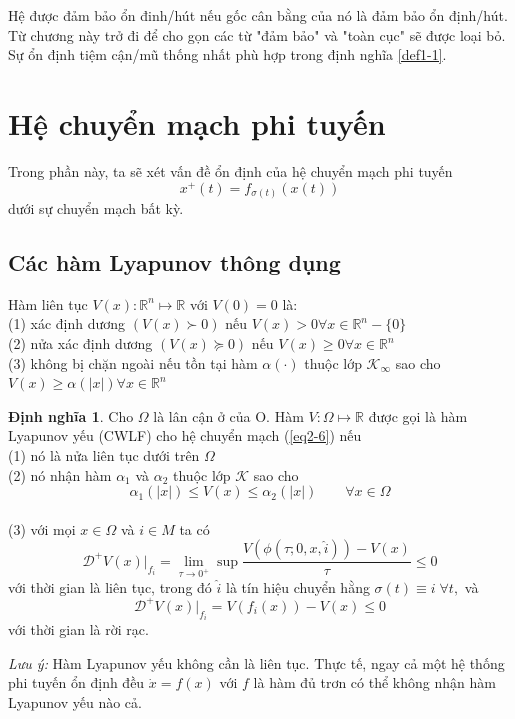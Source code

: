 \documentclass[14pt,a4paper,oneside]{report}		%
\theoremstyle{definition}
\newtheorem{define}[theorem]{Định nghĩa}
\begin{document}
Hệ được đảm bảo ổn đinh/hút nếu gốc cân bằng của nó là đảm bảo ổn định/hút. Từ chương này trở đi để cho gọn các từ "đảm bảo" và "toàn cục" sẽ được loại bỏ. Sự ổn định tiệm cận/mũ thống nhất phù hợp trong định nghĩa \ref{def1-1}.

\section{Hệ chuyển mạch phi tuyến}
Trong phần này, ta sẽ xét vấn đề ổn định của hệ chuyển mạch phi tuyến
\begin{equation} \label{eq2-6}
x^+(t)=f_{\sigma (t)}(x(t))
\end{equation}
dưới sự chuyển mạch bất kỳ.
\subsection{Các hàm Lyapunov thông dụng}
Hàm liên tục $V(x): \mathbb{R}^n\mapsto \mathbb{R}$ với $V(0)=0$ là:\\
(1) xác định dương $(V(x)\succ 0)$ nếu $V(x)>0\forall x\in\mathbb{R}^n-\{0\}$ \\
(2) nửa xác định dương $(V(x)\succeq 0)$ nếu $V(x)\geq 0\forall x\in\mathbb{R}^n$ \\
(3) không bị chặn ngoài nếu tồn tại hàm $\alpha (\cdot)$ thuộc lớp $\mathcal{K}_\infty$ sao cho $V(x)\geq \alpha(|x|)\forall x\in\mathbb{R}^n$ \\

\begin{define} \label{def2-2}
Cho $\Omega$ là lân cận ở của O. Hàm $V:\Omega \mapsto\mathbb{R}$ được gọi là hàm Lyapunov yếu (CWLF) cho hệ chuyển mạch (\ref{eq2-6}) nếu \\
(1) nó là nửa liên tục dưới trên $\Omega$\\
(2) nó nhận hàm $\alpha_1$ và $\alpha_2$ thuộc lớp $\mathcal{K}$ sao cho
$$\alpha_1(|x|)\leq V(x)\leq \alpha_2(|x|)\qquad \forall x\in\Omega$$\\
(3) với mọi $x\in\Omega$ và $i\in M$ ta có
$$\mathcal{D}^+V(x)|_{f_i} = \lim_{\tau \rightarrow 0^+}\sup\frac{V(\phi(\tau;0,x,\widehat{i}))-V(x)}{\tau}\leq 0$$
với thời gian là liên tục, trong đó $\widehat{i}$ là tín hiệu chuyển hằng $\sigma(t)\equiv i\; \forall t,$ và
$$\mathcal{D}^+V(x)|_{f_i}=V(f_i(x))-V(x)\leq 0$$
với thời gian là rời rạc.
\end{define}

\textit{Lưu ý:} Hàm Lyapunov yếu không cần là liên tục. Thực tế, ngay cả một hệ thống phi tuyến ổn định đều $\dot{x}=f(x)$ với $f$ là hàm đủ trơn có thể không nhận hàm Lyapunov yếu nào cả.
\end{document}
